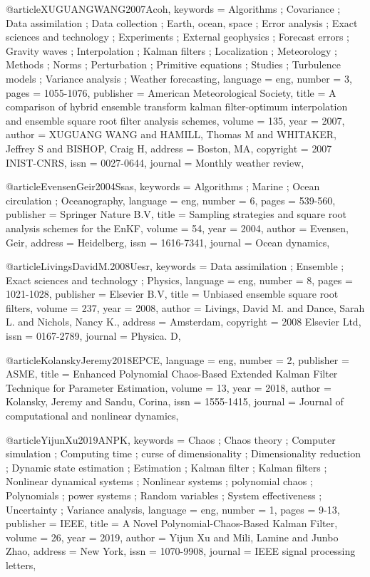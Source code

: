 @article{XUGUANGWANG2007Acoh,
keywords = {Algorithms ; Covariance ; Data assimilation ; Data collection ; Earth, ocean, space ; Error analysis ; Exact sciences and technology ; Experiments ; External geophysics ; Forecast errors ; Gravity waves ; Interpolation ; Kalman filters ; Localization ; Meteorology ; Methods ; Norms ; Perturbation ; Primitive equations ; Studies ; Turbulence models ; Variance analysis ; Weather forecasting},
language = {eng},
number = {3},
pages = {1055-1076},
publisher = {American Meteorological Society},
title = {A comparison of hybrid ensemble transform kalman filter-optimum interpolation and ensemble square root filter analysis schemes},
volume = {135},
year = {2007},
author = {XUGUANG WANG and HAMILL, Thomas M and WHITAKER, Jeffrey S and BISHOP, Craig H},
address = {Boston, MA},
copyright = {2007 INIST-CNRS},
issn = {0027-0644},
journal = {Monthly weather review},
}

@article{EvensenGeir2004Ssas,
keywords = {Algorithms ; Marine ; Ocean circulation ; Oceanography},
language = {eng},
number = {6},
pages = {539-560},
publisher = {Springer Nature B.V},
title = {Sampling strategies and square root analysis schemes for the EnKF},
volume = {54},
year = {2004},
author = {Evensen, Geir},
address = {Heidelberg},
issn = {1616-7341},
journal = {Ocean dynamics},
}

@article{LivingsDavidM.2008Uesr,
keywords = {Data assimilation ; Ensemble ; Exact sciences and technology ; Physics},
language = {eng},
number = {8},
pages = {1021-1028},
publisher = {Elsevier B.V},
title = {Unbiased ensemble square root filters},
volume = {237},
year = {2008},
author = {Livings, David M. and Dance, Sarah L. and Nichols, Nancy K.},
address = {Amsterdam},
copyright = {2008 Elsevier Ltd},
issn = {0167-2789},
journal = {Physica. D},
}

@article{KolanskyJeremy2018EPCE,
language = {eng},
number = {2},
publisher = {ASME},
title = {Enhanced Polynomial Chaos-Based Extended Kalman Filter Technique for Parameter Estimation},
volume = {13},
year = {2018},
author = {Kolansky, Jeremy and Sandu, Corina},
issn = {1555-1415},
journal = {Journal of computational and nonlinear dynamics},
}

@article{YijunXu2019ANPK,
keywords = {Chaos ; Chaos theory ; Computer simulation ; Computing time ; curse of dimensionality ; Dimensionality reduction ; Dynamic state estimation ; Estimation ; Kalman filter ; Kalman filters ; Nonlinear dynamical systems ; Nonlinear systems ; polynomial chaos ; Polynomials ; power systems ; Random variables ; System effectiveness ; Uncertainty ; Variance analysis},
language = {eng},
number = {1},
pages = {9-13},
publisher = {IEEE},
title = {A Novel Polynomial-Chaos-Based Kalman Filter},
volume = {26},
year = {2019},
author = {Yijun Xu and Mili, Lamine and Junbo Zhao},
address = {New York},
issn = {1070-9908},
journal = {IEEE signal processing letters},
}

